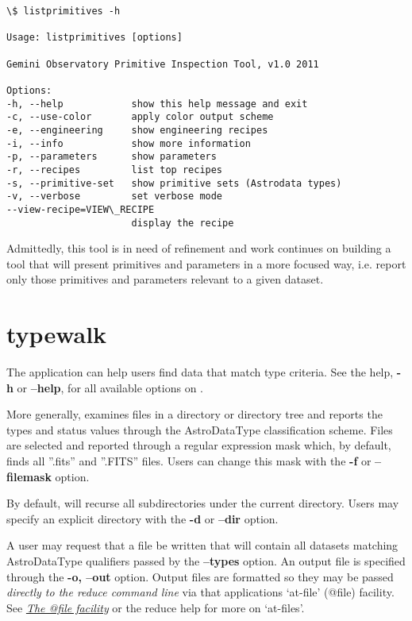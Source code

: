 \documentclass[letterpaper,10pt,english]{sphinxmanual}
\begin{document}
\begin{Verbatim}[commandchars=\\\{\}]
\$ listprimitives -h

Usage: listprimitives [options]

Gemini Observatory Primitive Inspection Tool, v1.0 2011

Options:
-h, --help            show this help message and exit
-c, --use-color       apply color output scheme
-e, --engineering     show engineering recipes
-i, --info            show more information
-p, --parameters      show parameters
-r, --recipes         list top recipes
-s, --primitive-set   show primitive sets (Astrodata types)
-v, --verbose         set verbose mode
--view-recipe=VIEW\_RECIPE
                      display the recipe
\end{Verbatim}

Admittedly, this tool is in need of refinement and work continues on
building a tool that will present primitives and parameters in a more focused
way, i.e. report only those primitives and parameters relevant to a given
dataset.


\section{typewalk}
\label{supptools:typewalk}\label{supptools:id1}
The application  can help users find data that match type
criteria. See the help, \textbf{-h} or \textbf{--help}, for all available options
on .

More generally,  examines files in a directory or directory tree and
reports the types and status values through the AstroDataType classification
scheme. Files are selected and reported through a regular expression mask
which, by default, finds all ''.fits'' and ''.FITS'' files. Users can change
this mask with the \textbf{-f} or \textbf{--filemask} option.

By default,  will recurse all subdirectories under the current
directory. Users may specify an explicit directory with the \textbf{-d} or
\textbf{--dir} option.

A user may request that a file be written that will contain all datasets
matching AstroDataType qualifiers passed by the \textbf{--types} option. An output
file is specified through the \textbf{-o, --out} option. Output files are formatted
so they may be passed \emph{directly to the reduce command line} via that applications
`at-file' (@file) facility. See {\hyperref[interfaces:atfile]{\emph{The @file facility}}} or the reduce help for more on
`at-files'.
\end{document}
